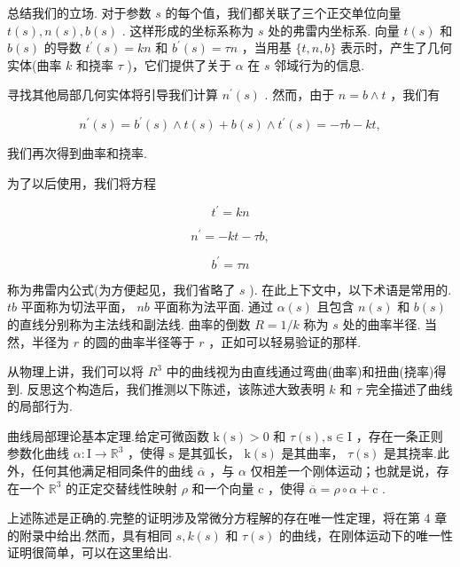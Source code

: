 总结我们的立场. 对于参数 \(s\) 的每个值，我们都关联了三个正交单位向量 \(t\left( s\right) ,n\left( s\right) ,b\left( s\right)\) . 这样形成的坐标系称为 \(s\) 处的弗雷内坐标系. 向量 \(t\left( s\right)\) 和 \(b\left( s\right)\) 的导数 \({t}^{\prime }\left( s\right)  = {kn}\) 和 \({b}^{\prime }\left( s\right)  = {\tau n}\) ，当用基 \(\{ t,n,b\}\) 表示时，产生了几何实体(曲率 \(k\) 和挠率 \(\tau\) )，它们提供了关于 \(\alpha\) 在 \(s\) 邻域行为的信息.

寻找其他局部几何实体将引导我们计算 \({n}^{\prime }\left( s\right)\) . 然而，由于 \(n = b \land  t\) ，我们有

\[
{n}^{\prime }\left( s\right)  = {b}^{\prime }\left( s\right)  \land  t\left( s\right)  + b\left( s\right)  \land  {t}^{\prime }\left( s\right)  =  - {\tau b} - {kt},
\]

我们再次得到曲率和挠率.

为了以后使用，我们将方程

\[
{t}^{\prime } = {kn}
\]

\[
{n}^{\prime } =  - {kt} - {\tau b},
\]

\[
{b}^{\prime } = {\tau n}
\]

称为弗雷内公式(为方便起见，我们省略了 \(s\) ). 在此上下文中，以下术语是常用的. \({tb}\) 平面称为切法平面， \({nb}\) 平面称为法平面. 通过 \(\alpha \left( s\right)\) 且包含 \(n\left( s\right)\) 和 \(b\left( s\right)\) 的直线分别称为主法线和副法线. 曲率的倒数 \(R = 1/k\) 称为 \(s\) 处的曲率半径. 当然，半径为 \(r\) 的圆的曲率半径等于 \(r\) ，正如可以轻易验证的那样.

从物理上讲，我们可以将 \({R}^{3}\) 中的曲线视为由直线通过弯曲(曲率)和扭曲(挠率)得到. 反思这个构造后，我们推测以下陈述，该陈述大致表明 \(k\) 和 \(\tau\) 完全描述了曲线的局部行为.

曲线局部理论基本定理.给定可微函数 \(\mathrm{k}\left( \mathrm{s}\right)  > 0\) 和 \(\tau \left( \mathrm{s}\right) ,\mathrm{s} \in  \mathrm{I}\) ，存在一条正则参数化曲线 \(\alpha  : \mathrm{I} \rightarrow  {\mathbb{R}}^{3}\) ，使得 \(\mathrm{s}\) 是其弧长， \(\mathrm{k}\left( \mathrm{s}\right)\) 是其曲率， \(\tau \left( \mathrm{s}\right)\) 是其挠率.此外，任何其他满足相同条件的曲线 \(\overline{\alpha }\) ，与 \(\alpha\) 仅相差一个刚体运动；也就是说，存在一个 \({\mathbb{R}}^{3}\) 的正定交替线性映射 \(\rho\) 和一个向量 \(\mathrm{c}\) ，使得 \(\overline{\alpha } = \rho  \circ  \alpha  + \mathrm{c}\) .

上述陈述是正确的.完整的证明涉及常微分方程解的存在唯一性定理，将在第 4 章的附录中给出.然而，具有相同 \(s,k\left( s\right)\) 和 \(\tau \left( s\right)\) 的曲线，在刚体运动下的唯一性证明很简单，可以在这里给出.

